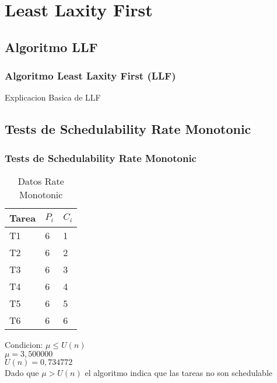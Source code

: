 \documentclass[xcolor=table]{beamer}
\begin{document}

\section{Least Laxity First}

\subsection{Algoritmo LLF}

\begin{frame} 
\frametitle{Algoritmo Least Laxity First (LLF)} 
Explicacion Basica de LLF \\
\end{frame}

\subsection{Tests de Schedulability  Rate Monotonic } 

\begin{frame} 
\frametitle{Tests de Schedulability  Rate Monotonic } 
\begin{table} 
\centering 
\begin{tabular}{|l|l|l|} 
\hline 
\cellcolor{lightgray}Tarea & \cellcolor{lightgray}$P_i$ & \cellcolor{lightgray}$C_i$ \\ \hline 
T1   & 6  &  1\\ \hline 
T2   & 6  &  2\\ \hline 
T3   & 6  &  3\\ \hline 
T4   & 6  &  4\\ \hline 
T5   & 6  &  5\\ \hline 
T6   & 6  &  6\\ \hline 
\end{tabular} 
\caption{Datos  Rate Monotonic } 
\end{table} 
Condicion: $\mu \leq U(n)$ \\ 
$\mu =  3,500000 $ \\ 
$U(n) =  0,734772 $ \\ 
Dado que $\mu>U(n)$ el algoritmo indica que las tareas no son schedulable \\ 
\end{frame} 

\end{document}
